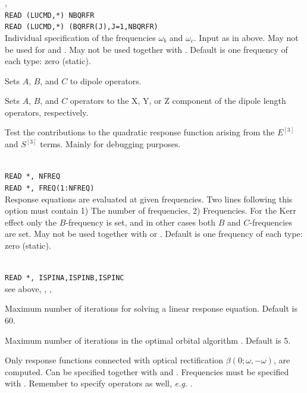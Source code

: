 \begin{description}
\item{, }\\
\verb|READ (LUCMD,*) NBQRFR|\\
\verb|READ (LUCMD,*) (BQRFR(J),J=1,NBQRFR)|\\
Individual specification of the frequencies $\omega_b$ and $\omega_c$.
Input as in  above.
May not be used for  and .
May not be used together with .
Default is one frequency of each type: zero (static).

\item{}
Sets $A$, $B$, and $C$ to dipole operators.

\item{}
Sets $A$, $B$, and $C$ operators to the X, Y, or Z component of the
dipole length operators, respectively.

\item{}
Test the contributions to the quadratic response function arising from
the $E^{\left[3\right]}$ and $S^{\left[3\right]}$ terms.  Mainly for
debugging purposes.

\item{}\\
\verb|READ *, NFREQ|\\
\verb|READ *, FREQ(1:NFREQ)|\\
Response equations are evaluated at given
frequencies. Two lines
following this option must contain 1) The number of frequencies, 2)
Frequencies.
For the Kerr effect only the $B$-frequency is set,
and in other cases both $B$ and $C$-frequencies are set.
May not be used together with  or .
Default is one frequency of each type: zero (static).

\item{}\\
\verb|READ *, ISPINA,ISPINB,ISPINC|\\
see above, , , 


\item{}
Maximum number of iterations for solving a linear response equation.
Default is 60.

\item{}
Maximum number of iterations in the optimal
orbital algorithm
\cite{tuhjahjajpjjcp84}.
Default is 5.

\item{}
Only response functions connected with optical rectification
$\beta(0; \omega,-\omega)$, are computed.
Can be specified together with  and .
Frequencies must be specified with .
Remember to specify operators as well, {\it e.g.\/} .


\end{description}
